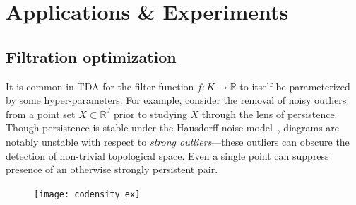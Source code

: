 \documentclass[10pt]{article}
\numberwithin{equation}{section}
\newcommand{\+}{%
	\raisebox{0.18ex}{\scaleobj{0.55}{+}}
}
\newtheorem{corollary}{Corollary}
\theoremstyle{definition}
\theoremstyle{definition}
\begin{document}





\newpage

\newpage

\section{Applications \& Experiments}\label{sec:applications}


\subsection*{Filtration optimization}
It is common in TDA for the filter function $f : K \to \mathbb{R}$ to itself be parameterized by some hyper-parameters.
For example, consider the removal of noisy outliers from a point set $X \subset \mathbb{R}^d$ prior to studying $X$ through the lens of persistence. 
Though persistence is stable under the Hausdorff noise model~\cite{}, diagrams are notably unstable with respect to \emph{strong outliers}---these outliers can obscure the detection of non-trivial topological space. 
Even a single point can suppress presence of an otherwise strongly persistent pair. 

\begin{figure}
	\centering
	\texttt{[image: codensity\_ex]}
\end{figure}
\end{document}
